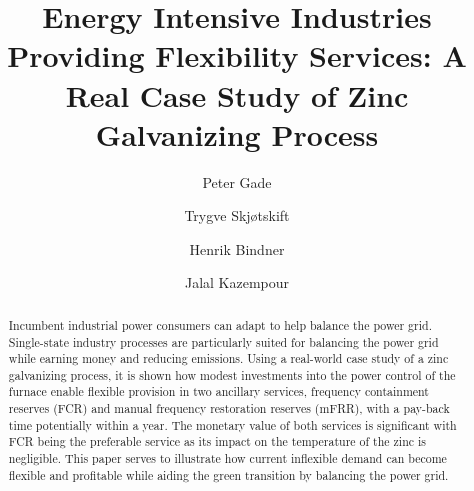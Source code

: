 \documentclass[sigconf]{acmart}
\begin{document}
\title{Energy Intensive Industries Providing Flexibility Services: A Real Case Study of Zinc Galvanizing Process}


\author{Peter Gade}

\author{Trygve Skj{\o}tskift}

\author{Henrik Bindner}

\author{Jalal Kazempour}

\renewcommand{\shortauthors}{Gade et al.}

\begin{abstract}
    Incumbent industrial power consumers can adapt to help balance the power grid. Single-state industry processes are particularly suited for balancing the power grid while earning money and reducing emissions. Using a real-world case study of a zinc galvanizing process, it is shown how modest investments into the power control of the furnace enable flexible provision in two ancillary services, frequency containment reserves (FCR) and manual frequency restoration reserves (mFRR), with a pay-back time potentially within a year. The monetary value of both services is significant with FCR being the preferable service as its impact on the temperature of the zinc is negligible. This paper serves to illustrate how current inflexible demand can become flexible and profitable while aiding the green transition by balancing the power grid.
\end{abstract}
\end{document}

